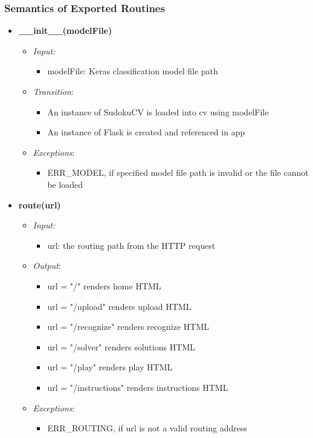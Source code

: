 \documentclass[11pt]{article}
\begin{document}
		\subsubsection{Semantics of Exported Routines}
		\begin{itemize}
		    \item \textbf{\_\_init\_\_(modelFile)}
		\begin{itemize}
		    \item[] \textit{Input: }
			\begin{itemize}
		        \item modelFile: Keras classification model file path
		    \end{itemize}	    
		    
		    \item[] \textit{Transition}: 
		    \begin{itemize}
		        \item An instance of SudokuCV is loaded into cv using modelFile
		        \item An instance of Flask is created and referenced in app
		    \end{itemize}
		    \item[] \textit{Exceptions}:
			\begin{itemize}
		        \item ERR\_MODEL, if specified model file path is invalid or the file cannot be loaded
		    \end{itemize}	  
		\end{itemize}
		
	    \item \textbf{route(url)}
		\begin{itemize}
		    \item[] \textit{Input: } 
		    \begin{itemize}
		        \item url: the routing path from the HTTP request
		    \end{itemize}	  
		    \item[] \textit{Output}: 
		    \begin{itemize}
		        \item url = "/" renders home HTML
		        \item url = "/upload" renders upload HTML
		        \item url = "/recognize" renders recognize HTML
		        \item url = "/solver" renders solutions HTML
		        \item url = "/play" renders play HTML
		        \item url = "/instructions" renders instructions HTML
		    \end{itemize}
		    \item[] \textit{Exceptions}:
		    \begin{itemize}
		        \item ERR\_ROUTING, if url is not a valid routing address
		    \end{itemize}
		\end{itemize}
		
    \end{itemize}
    
\end{document}
